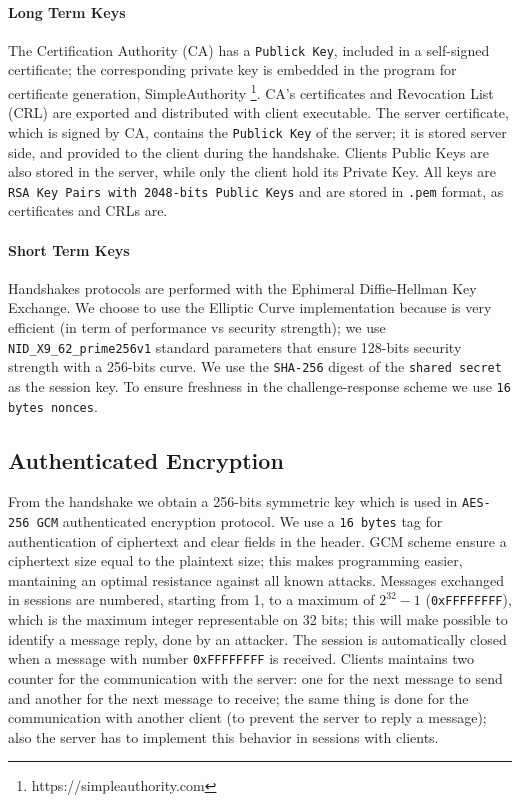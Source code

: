\documentclass[11pt]{report}
\begin{document}
\paragraph*{Long Term Keys}
The Certification Authority (CA) has a \texttt{Publick Key}, included in a self-signed
certificate; the corresponding private key is embedded in the program for certificate generation, 
SimpleAuthority \footnote{https://simpleauthority.com}.
CA's certificates and Revocation List (CRL) are exported and distributed with client executable.
The server certificate, which is signed by CA, contains the \texttt{Publick Key} of the server; it
is stored server side, and provided to the client during the handshake.
Clients Public Keys are also stored in the server, while only the client hold its Private Key.
All keys are \texttt{RSA Key Pairs with 2048-bits Public Keys} and are stored in \texttt{.pem} format, as certificates and CRLs are.
\paragraph*{Short Term Keys}
Handshakes protocols are performed with the Ephimeral Diffie-Hellman Key Exchange. 
We choose to use the Elliptic Curve implementation because is very efficient (in term of performance vs security strength);
we use \verb|NID_X9_62_prime256v1| standard parameters that ensure 128-bits security strength with a 256-bits curve. We use the \texttt{SHA-256} digest of the \texttt{shared secret} as
the session key.
To ensure freshness in the challenge-response scheme we use \texttt{16 bytes nonces}.
\subsection{Authenticated Encryption}
From the handshake we obtain a 256-bits symmetric key which is used in \texttt{AES-256 GCM} authenticated encryption protocol.
We use a \texttt{16 bytes} tag for authentication of ciphertext and clear fields in the header. GCM scheme ensure a ciphertext
size equal to the plaintext size; this makes programming easier, mantaining an optimal resistance against all known attacks.
Messages exchanged in sessions are numbered, starting from 1, to a maximum of $2^{32}-1$ (\verb|0xFFFFFFFF|), which is the
maximum integer representable on 32 bits; this will make possible to identify a message reply, done
by an attacker. The session is automatically closed when a message with number \verb|0xFFFFFFFF| is received.
Clients maintains two counter for the communication with the server:  one for the next message to send and another for
the next message to receive; the same thing is done for the communication with another client (to prevent the server to 
reply a message); also the server has to implement this behavior in sessions with clients.
\end{document}
